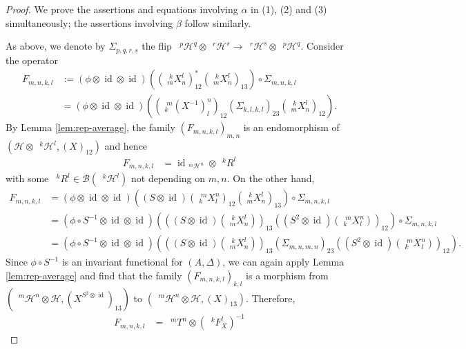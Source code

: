 \documentclass[12pt]{article}
\theoremstyle{change}
\DeclareMathOperator{\id}{id}
\newcommand{\Gr}[5]{\;{}^{\;#2}_{#4}#1_{#5}^{#3}}%
\newcommand{\Gru}[3]{\;{}^{\;#2}#1^{#3}}
\theoremstyle{definition}
\numberwithin{equation}{section}
\begin{document}
\begin{proof}
  We prove the assertions and equations involving $\alpha$ in (1), (2)
  and (3)  simultaneously; the assertions involving $\beta$  follow similarly.

  As above, we denote by $\Sigma_{p,q,r,s}$ the flip
  $\Gru{\mathcal{H}}{p}{q} \otimes \Gru{\mathcal{H}}{r}{s} \to
  \Gru{\mathcal{H}}{r}{s} \otimes \Gru{\mathcal{H}}{p}{q}$.  Consider
  the operator
  \begin{align*}
    F_{m,n,k,l}
    &:=(\phi \otimes \id \otimes \id)((\Gr{X}{k}{l}{m}{n})_{12}^{*}(\Gr{X}{k}{l}{m}{n})_{13})
    \circ \Sigma_{m,n,k,l} \\ &= (\phi \otimes \id \otimes
    \id)\left((\Gr{(X^{-1})}{m}{n}{k}{l})_{12}
      (\Sigma_{k,l,k,l})_{23}(\Gr{X}{k}{l}{m}{n})_{12}\right).
  \end{align*}
  By Lemma \ref{lem:rep-average}, the family $(F_{m,n,k,l})_{m,n}$ is
  an endomorphism of $(\mathcal{H} \otimes \Gru{\mathcal{H}}{k}{l}, (X)_{12})$ and hence
  \begin{align}
    F_{m,n,k,l} &= \id_{\Gru{\mathcal{H}}{m}{n}} \otimes \Gru{R}{k}{l} \label{eq:rep-orthogonal-1}
  \end{align}
  with some $\Gru{R}{k}{l} \in \mathcal{B}(\Gru{\mathcal{H}}{k}{l})$ not
  depending on $m,n$.
  On the other hand, 
  \begin{align*}
    F_{m,n,k,l} &= (\phi \otimes \id \otimes \id)((S \otimes
    \id)(\Gr{X}{m}{n}{k}{l})_{12}(\Gr{X}{k}{l}{m}{n})_{13})
    \circ \Sigma_{m,n,k,l} \\
    &= (\phi\circ S^{-1} \otimes \id \otimes \id)\left(((S \otimes
      \id)(\Gr{X}{k}{l}{m}{n}))_{13}
      ((S^{2} \otimes \id)(\Gr{X}{m}{n}{k}{l}))_{12}\right)     \circ \Sigma_{m,n,k,l}\\
    &= (\phi\circ S^{-1} \otimes \id \otimes \id)\left(((S \otimes
      \id)(\Gr{X}{k}{l}{m}{n}))_{13} (\Sigma_{m,n,m,n})_{23} ((S^{2}
      \otimes \id)(\Gr{X}{m}{n}{k}{l}))_{12}\right).
  \end{align*}
  Since $\phi\circ S^{-1}$ is an invariant functional for
  $(A,\Delta)$, we can again apply Lemma \ref{lem:rep-average} and
  find that the family $(F_{m,n,k,l})_{k,l}$ is a morphism from
  $(\Gru{\mathcal{H}}{m}{n} \otimes \mathcal{H}, (X^{S^{2} \otimes
    \id})_{13})$ to $(\Gru{\mathcal{H}}{m}{n} \otimes \mathcal{H},
  (X)_{13})$. Therefore,
  \begin{align}
    F_{m,n,k,l} &= \Gru{T}{m}{n} \otimes (\Gru{F_{X}}{k}{l})^{-1} \label{eq:rep-orthogonal-2}
  \end{align}

\end{proof}
\end{document}
